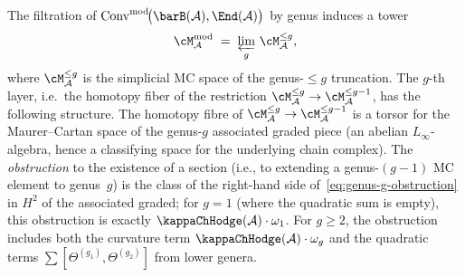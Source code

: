 \begin{proposition}
\label{prop:genus-tower-postnikov}
The filtration of
$\Conv^{\mathrm{mod}}\!\bigl(\barB(\cA),\End(\cA)\bigr)$
by genus induces a tower
\begin{equation}\label{eq:postnikov-tower}
\cM^{\mathrm{mod}}_\cA
\;=\;
\varprojlim_{g}\, \cM^{\leq g}_\cA,
\end{equation}
where $\cM^{\leq g}_\cA$ is the simplicial MC space of the
genus-$\leq g$ truncation. The $g$-th layer, i.e.\ the
homotopy fiber of the restriction
$\cM^{\leq g}_\cA \to \cM^{\leq g-1}_\cA$,
has the following structure.
The homotopy fibre of $\cM^{\leq g}_\cA \to \cM^{\leq g-1}_\cA$ is a torsor for the Maurer--Cartan space of the genus-$g$ associated graded piece (an abelian $L_\infty$-algebra, hence a classifying space for the underlying chain complex). The \emph{obstruction} to the existence of a section (i.e., to extending a genus-$(g-1)$ MC element to genus~$g$) is the class of the right-hand side of~\eqref{eq:genus-g-obstruction} in $H^2$ of the associated graded; for $g = 1$ (where the quadratic sum is empty), this obstruction is exactly $\kappaChHodge(\cA) \cdot \omega_1$. For $g \geq 2$, the obstruction includes both the curvature term $\kappaChHodge(\cA) \cdot \omega_g$ and the quadratic terms $\sum [\Theta^{(g_1)}, \Theta^{(g_2)}]$ from lower genera.
\end{proposition}

